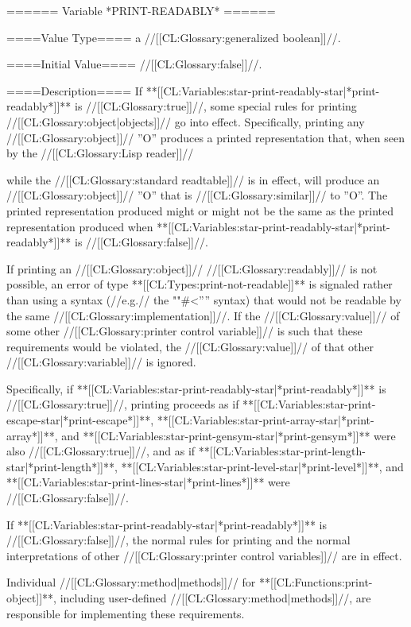 ====== Variable *PRINT-READABLY* ======

====Value Type====
a //[[CL:Glossary:generalized boolean]]//.

====Initial Value====
//[[CL:Glossary:false]]//.

====Description====
If **[[CL:Variables:star-print-readably-star|*print-readably*]]** is //[[CL:Glossary:true]]//, some special rules for printing //[[CL:Glossary:object|objects]]// go into effect. Specifically, printing any //[[CL:Glossary:object]]// ''O'' produces a printed representation that, when seen by the //[[CL:Glossary:Lisp reader]]//

while the //[[CL:Glossary:standard readtable]]// is in effect, will produce an //[[CL:Glossary:object]]// ''O'' that is //[[CL:Glossary:similar]]// to ''O''. The printed representation produced might or might not be the same as the printed representation produced when **[[CL:Variables:star-print-readably-star|*print-readably*]]** is //[[CL:Glossary:false]]//.

If printing an //[[CL:Glossary:object]]// //[[CL:Glossary:readably]]// is not possible, an error of type **[[CL:Types:print-not-readable]]** is signaled rather than using a syntax (//e.g.// the ""#<'''' syntax) that would not be readable by the same //[[CL:Glossary:implementation]]//. If the //[[CL:Glossary:value]]// of some other //[[CL:Glossary:printer control variable]]// is such that these requirements would be violated, the //[[CL:Glossary:value]]// of that other //[[CL:Glossary:variable]]// is ignored.

Specifically, if **[[CL:Variables:star-print-readably-star|*print-readably*]]** is //[[CL:Glossary:true]]//, printing proceeds as if **[[CL:Variables:star-print-escape-star|*print-escape*]]**, **[[CL:Variables:star-print-array-star|*print-array*]]**, and **[[CL:Variables:star-print-gensym-star|*print-gensym*]]** were also //[[CL:Glossary:true]]//, and as if **[[CL:Variables:star-print-length-star|*print-length*]]**, **[[CL:Variables:star-print-level-star|*print-level*]]**, and **[[CL:Variables:star-print-lines-star|*print-lines*]]** were //[[CL:Glossary:false]]//.

If **[[CL:Variables:star-print-readably-star|*print-readably*]]** is //[[CL:Glossary:false]]//, the normal rules for printing and the normal interpretations of other //[[CL:Glossary:printer control variables]]// are in effect.

Individual //[[CL:Glossary:method|methods]]// for **[[CL:Functions:print-object]]**, including user-defined //[[CL:Glossary:method|methods]]//, are responsible for implementing these requirements.

